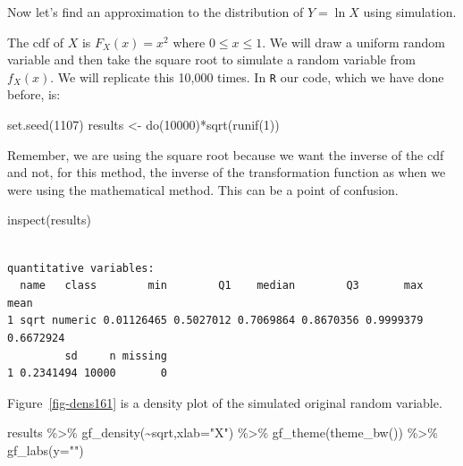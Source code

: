 \documentclass[
  letterpaper,
  DIV=11,
  numbers=noendperiod]{scrreprt}
\newenvironment{Shaded}{\begin{snugshade}}{\end{snugshade}}
\newcommand{\AttributeTok}[1]{\textcolor[rgb]{0.40,0.45,0.13}{#1}}
\newcommand{\DecValTok}[1]{\textcolor[rgb]{0.68,0.00,0.00}{#1}}
\newcommand{\FunctionTok}[1]{\textcolor[rgb]{0.28,0.35,0.67}{#1}}
\newcommand{\NormalTok}[1]{\textcolor[rgb]{0.00,0.23,0.31}{#1}}
\newcommand{\OtherTok}[1]{\textcolor[rgb]{0.00,0.23,0.31}{#1}}
\newcommand{\SpecialCharTok}[1]{\textcolor[rgb]{0.37,0.37,0.37}{#1}}
\newcommand{\StringTok}[1]{\textcolor[rgb]{0.13,0.47,0.30}{#1}}
\begin{document}
Now let's find an approximation to the distribution of \(Y = \ln{X}\)
using simulation.

The cdf of \(X\) is \(F_X(x)=x^2\) where \(0 \leq x \leq 1\). We will
draw a uniform random variable and then take the square root to simulate
a random variable from \(f_X(x)\). We will replicate this 10,000 times.
In \texttt{R} our code, which we have done before, is:

\begin{Shaded}
\begin{Highlighting}[]
\FunctionTok{set.seed}\NormalTok{(}\DecValTok{1107}\NormalTok{)}
\NormalTok{results }\OtherTok{\textless{}{-}} \FunctionTok{do}\NormalTok{(}\DecValTok{10000}\NormalTok{)}\SpecialCharTok{*}\FunctionTok{sqrt}\NormalTok{(}\FunctionTok{runif}\NormalTok{(}\DecValTok{1}\NormalTok{))}
\end{Highlighting}
\end{Shaded}

Remember, we are using the square root because we want the inverse of
the cdf and not, for this method, the inverse of the transformation
function as when we were using the mathematical method. This can be a
point of confusion.

\begin{Shaded}
\begin{Highlighting}[]
\FunctionTok{inspect}\NormalTok{(results)}
\end{Highlighting}
\end{Shaded}

\begin{verbatim}

quantitative variables:  
  name   class        min        Q1    median        Q3       max      mean
1 sqrt numeric 0.01126465 0.5027012 0.7069864 0.8670356 0.9999379 0.6672924
         sd     n missing
1 0.2341494 10000       0
\end{verbatim}

Figure~\ref{fig-dens161} is a density plot of the simulated original
random variable.

\begin{Shaded}
\begin{Highlighting}[]
\NormalTok{results }\SpecialCharTok{\%\textgreater{}\%}
  \FunctionTok{gf\_density}\NormalTok{(}\SpecialCharTok{\textasciitilde{}}\NormalTok{sqrt,}\AttributeTok{xlab=}\StringTok{"X"}\NormalTok{) }\SpecialCharTok{\%\textgreater{}\%}
  \FunctionTok{gf\_theme}\NormalTok{(}\FunctionTok{theme\_bw}\NormalTok{()) }\SpecialCharTok{\%\textgreater{}\%}
  \FunctionTok{gf\_labs}\NormalTok{(}\AttributeTok{y=}\StringTok{""}\NormalTok{)}
\end{Highlighting}
\end{Shaded}
\end{document}
